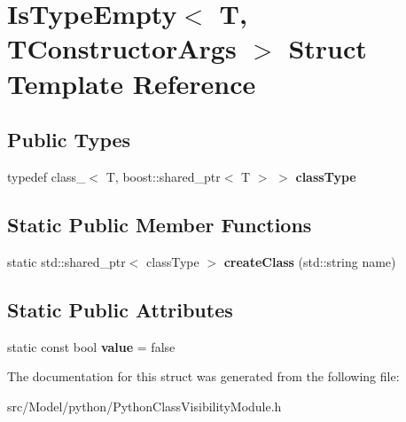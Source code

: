 \hypertarget{structIsTypeEmpty}{}\section{Is\+Type\+Empty$<$ T, T\+Constructor\+Args $>$ Struct Template Reference}
\label{structIsTypeEmpty}
\subsection*{Public Types}
\begin{DoxyCompactItemize}
\item 
typedef class\+\_\+$<$ T, boost\+::shared\+\_\+ptr$<$ T $>$ $>$ {\bfseries class\+Type}\hypertarget{structIsTypeEmpty_ab99c8546dca52ffa87465622fd5e1b76}{}\label{structIsTypeEmpty_ab99c8546dca52ffa87465622fd5e1b76}

\end{DoxyCompactItemize}
\subsection*{Static Public Member Functions}
\begin{DoxyCompactItemize}
\item 
static std\+::shared\+\_\+ptr$<$ class\+Type $>$ {\bfseries create\+Class} (std\+::string name)\hypertarget{structIsTypeEmpty_ab5127b143e87961459629e18e4c21f55}{}\label{structIsTypeEmpty_ab5127b143e87961459629e18e4c21f55}

\end{DoxyCompactItemize}
\subsection*{Static Public Attributes}
\begin{DoxyCompactItemize}
\item 
static const bool {\bfseries value} = false\hypertarget{structIsTypeEmpty_aac27477fc9ac3fed15b799922e502194}{}\label{structIsTypeEmpty_aac27477fc9ac3fed15b799922e502194}

\end{DoxyCompactItemize}


The documentation for this struct was generated from the following file\+:\begin{DoxyCompactItemize}
\item 
src/\+Model/python/Python\+Class\+Visibility\+Module.\+h\end{DoxyCompactItemize}
